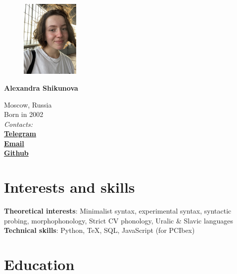 \documentclass[11pt]{article} %
\begin{document}

\begin{figure} %
    \centering
    \includegraphics[width=0.25\textwidth]{photo}
\end{figure}
{\LARGE\bfseries Alexandra Shikunova} %
\bigskip\bigskip\medskip %

Moscow, Russia\\
Born in 2002\\

\textit{Contacts:}\\
\textbf{\href{https://t.me/thnlgrlivrlvdwsbrnwthrssnhrys}{Telegram}}\\
\textbf{\href{mailto:notalexandrashikunova@gmail.com}{Email}}\\
\textbf{\href{https://github.com/poisongrapevine}{Github}}
\medskip %


\section*{Interests and skills}

\textbf{Theoretical interests}: Minimalist syntax, experimental syntax, syntactic probing, morphophonology, Strict CV phonology, Uralic \& Slavic languages\\
\textbf{Technical skills}: Python, TeX, SQL, JavaScript (for PCIbex)


\section*{Education}
\end{document}
